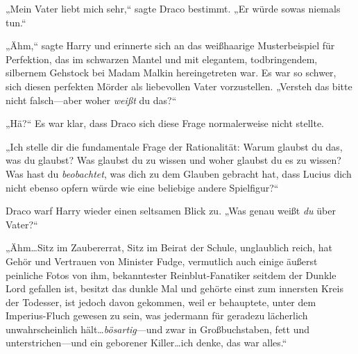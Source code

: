 „Mein Vater liebt mich sehr,“ sagte Draco bestimmt. „Er würde sowas niemals tun.“

„Ähm,“ sagte Harry und erinnerte sich an das weißhaarige Musterbeispiel für Perfektion, das im schwarzen Mantel und mit elegantem, todbringendem, silbernem Gehstock bei Madam Malkin hereingetreten war. Es war so schwer, sich diesen perfekten Mörder als liebevollen Vater vorzustellen. „Versteh das bitte nicht falsch—aber woher \emph{weißt} du das?“

„Hä?“ Es war klar, dass Draco sich diese Frage normalerweise nicht stellte.

„Ich stelle dir die fundamentale Frage der Rationalität: Warum glaubst du das, was du glaubst? Was glaubst du zu wissen und woher glaubst du es zu wissen? Was hast du \emph{beobachtet}, was dich zu dem Glauben gebracht hat, dass Lucius dich nicht ebenso opfern würde wie eine beliebige andere Spielfigur?“

Draco warf Harry wieder einen seltsamen Blick zu. „Was genau weißt \emph{du} über Vater?“

„Ähm…Sitz im Zaubererrat, Sitz im Beirat der Schule, unglaublich reich, hat Gehör und Vertrauen von Minister Fudge, vermutlich auch einige äußerst peinliche Fotos von ihm, bekanntester Reinblut-Fanatiker seitdem der Dunkle Lord gefallen ist, besitzt das dunkle Mal und gehörte einst zum innersten Kreis der Todesser, ist jedoch davon gekommen, weil er behauptete, unter dem Imperius-Fluch gewesen zu sein, was jedermann für geradezu lächerlich unwahrscheinlich hält…\emph{bösartig}—und zwar in Großbuchstaben, fett und unterstrichen—und ein geborener Killer…ich denke, das war alles.“

